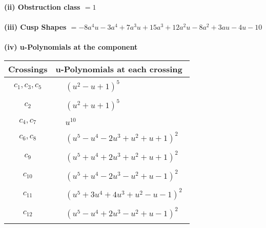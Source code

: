 \documentclass[1p]{elsarticle_modified}
\theoremstyle{definition}
\begin{document}
\flushleft \textbf{(ii) Obstruction class $= 1$}\\~\\
\flushleft \textbf{(iii) Cusp Shapes $= -8 a^4 u-3 a^4+7 a^3 u+15 a^3+12 a^2 u-8 a^2+3 a u-4 u-10$}\\~\\
\newpage\renewcommand{\arraystretch}{1}
\flushleft \textbf{(iv) u-Polynomials at the component}\newline \\
\begin{tabular}{m{50pt}|m{274pt}}
Crossings & \hspace{64pt}u-Polynomials at each crossing \\
\hline $$\begin{aligned}c_{1},c_{3},c_{5}\end{aligned}$$&$\begin{aligned}
&(u^2- u+1)^5
\end{aligned}$\\
\hline $$\begin{aligned}c_{2}\end{aligned}$$&$\begin{aligned}
&(u^2+u+1)^5
\end{aligned}$\\
\hline $$\begin{aligned}c_{4},c_{7}\end{aligned}$$&$\begin{aligned}
&u^{10}
\end{aligned}$\\
\hline $$\begin{aligned}c_{6},c_{8}\end{aligned}$$&$\begin{aligned}
&(u^5- u^4-2 u^3+u^2+u+1)^2
\end{aligned}$\\
\hline $$\begin{aligned}c_{9}\end{aligned}$$&$\begin{aligned}
&(u^5+u^4+2 u^3+u^2+u+1)^2
\end{aligned}$\\
\hline $$\begin{aligned}c_{10}\end{aligned}$$&$\begin{aligned}
&(u^5+u^4-2 u^3- u^2+u-1)^2
\end{aligned}$\\
\hline $$\begin{aligned}c_{11}\end{aligned}$$&$\begin{aligned}
&(u^5+3 u^4+4 u^3+u^2- u-1)^2
\end{aligned}$\\
\hline $$\begin{aligned}c_{12}\end{aligned}$$&$\begin{aligned}
&(u^5- u^4+2 u^3- u^2+u-1)^2
\end{aligned}$\\
\hline
\end{tabular}\\~\\
\end{document}
